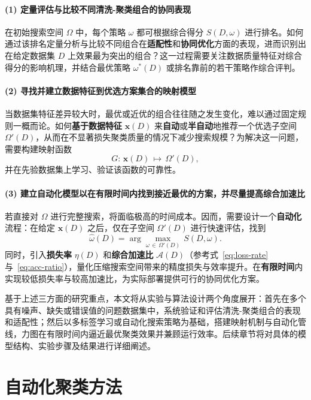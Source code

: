 \documentclass[8pt]{article} %
\numberwithin{equation}{section}
\begin{document}
\paragraph{(1) 定量评估与比较不同清洗-聚类组合的协同表现}
在初始搜索空间 \(\Omega\) 中，每个策略 \(\omega\) 都可根据综合得分 \(S(D,\omega)\) 进行排名。如何通过该排名定量分析与比较不同组合在\textbf{适配性}和\textbf{协同优化}方面的表现，进而识别出在给定数据集 \(D\) 上效果最为突出的组合？这一过程需要关注数据质量特征对综合得分的影响机理，并结合最优策略 \(\omega^*(D)\) 或排名靠前的若干策略作综合评判。

\paragraph{(2) 寻找并建立数据特征到优选方案集合的映射模型}
当数据集特征差异较大时，最优或近优的组合往往随之发生变化，难以通过固定规则一概而论。如何\textbf{基于数据特征} \(\mathbf{x}(D)\) 来\textbf{自动}或\textbf{半自动}地推荐一个优选子空间 \(\Omega'(D)\)，从而在不显著损失聚类质量的情况下减少搜索规模？为解决这一问题，需要构建映射函数
\[
  G:\,\mathbf{x}(D)\,\mapsto\,\Omega'(D),
\]
并在先验数据集上学习、验证该函数的可靠性。

\paragraph{(3) 建立自动化模型以在有限时间内找到接近最优的方案，并尽量提高综合加速比}
若直接对 \(\Omega\) 进行完整搜索，将面临极高的时间成本。因而，需要设计一个\textbf{自动化}流程：在给定 \(\mathbf{x}(D)\) 之后，仅在子空间 \(\Omega'(D)\) 进行快速评估，找到
\begin{equation}\label{eq:local best strategy}
  \hat{\omega}(D) 
  = 
  \arg\max_{\omega \,\in\,\Omega'(D)} \, S(D,\omega).
\end{equation}
同时，引入\textbf{损失率} \(\eta(D)\) 和\textbf{综合加速比} \(\mathcal{A}(D)\)（参考式~\eqref{eq:loss-rate} 与~\eqref{eq:acc-ratio}），量化压缩搜索空间带来的精度损失与效率提升。在\textbf{有限时间}内实现较低损失率与较高加速比，为实际部署提供可行的协同优化方案。

基于上述三方面的研究重点，本文将从实验与算法设计两个角度展开：首先在多个具有噪声、缺失或错误值的问题数据集中，系统验证和评估清洗-聚类组合的表现和适配性；然后以多标签学习或自动化搜索策略为基础，搭建映射机制与自动化管线，力图在有限时间内逼近最优聚类效果并兼顾运行效率。后续章节将对具体的模型结构、实验步骤及结果进行详细阐述。

\section{自动化聚类方法}
\label{sec:autoML}
\end{document}

